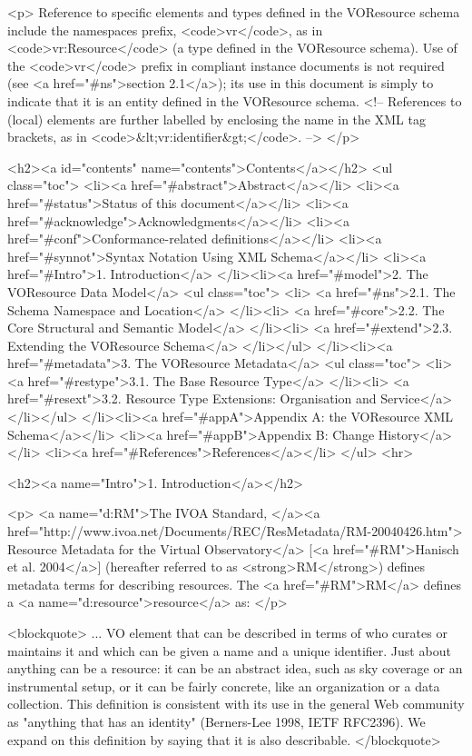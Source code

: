 \documentclass[11pt,a4paper]{ivoa}
\begin{document}
<p>
Reference to specific elements and types defined in the VOResource
schema include the namespaces prefix, <code>vr</code>, as in
<code>vr:Resource</code> (a type defined in the VOResource schema).
Use of the <code>vr</code> prefix in compliant instance documents is 
not required (see <a href="#ns">section 2.1</a>); its use in this
document is simply to indicate that it is an entity defined in the
VOResource schema.  <!-- References to (local) elements are further
labelled by enclosing the name in the XML tag brackets, as in
<code>&lt;vr:identifier&gt;</code>.  -->
</p>

<h2><a id="contents" name="contents">Contents</a></h2>
<ul class="toc">
  <li><a href="#abstract">Abstract</a></li>
  <li><a href="#status">Status of this document</a></li>
  <li><a href="#acknowledge">Acknowledgments</a></li>
  <li><a href="#conf">Conformance-related definitions</a></li>
  <li><a href="#synnot">Syntax Notation Using XML Schema</a></li>
  <li><a href="#Intro">1. Introduction</a>
  </li><li><a href="#model">2. The VOResource Data Model</a>
       <ul class="toc">
         <li> <a href="#ns">2.1. The Schema Namespace and Location</a>
         </li><li> <a href="#core">2.2. The Core Structural and Semantic Model</a>
         </li><li> <a href="#extend">2.3. Extending the VOResource Schema</a>
       </li></ul>
  </li><li><a href="#metadata">3. The VOResource Metadata</a>
       <ul class="toc">
         <li> <a href="#restype">3.1.  The Base Resource Type</a>
         </li><li> <a href="#resext">3.2.  Resource Type Extensions:  Organisation and Service</a>
       </li></ul>
  </li><li><a href="#appA">Appendix A: the VOResource XML Schema</a></li>
  <li><a href="#appB">Appendix B: Change History</a></li>
  <li><a href="#References">References</a></li>
</ul>
<hr>

<h2><a name="Intro">1. Introduction</a></h2>

<p>
<a name="d:RM">The IVOA Standard,
</a><a href="http://www.ivoa.net/Documents/REC/ResMetadata/RM-20040426.htm">
Resource Metadata for the Virtual Observatory</a>
[<a href="#RM">Hanisch et al. 2004</a>] (hereafter referred to as
<strong>RM</strong>) defines metadata terms for describing resources.
The <a href="#RM">RM</a> defines a <a name="d:resource">resource</a> as: 
</p>

<blockquote>
... VO element that can be described in terms of who curates or
maintains it and which can be given a name and a unique identifier.
Just about anything can be a resource: it can be an abstract idea,
such as sky coverage or an instrumental setup, or it can be fairly
concrete, like an organization or a data collection.  This definition
is consistent with its use in the general Web community as
"anything that has an identity" (Berners-Lee 1998, IETF RFC2396).  We
expand on this definition by saying that it is also describable.  
</blockquote>
\end{document}
